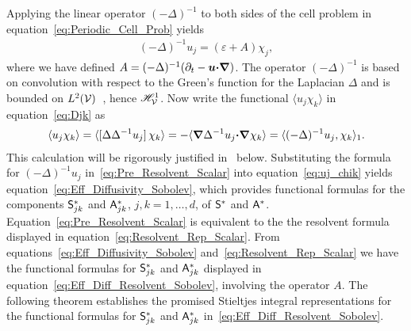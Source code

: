 \documentclass[amsa]{ipart}
\begin{document}
Applying the linear operator $(-\Delta)^{-1}$ to both sides of the cell
problem in equation~\eqref{eq:Periodic_Cell_Prob} yields
%
\begin{align}\label{eq:Pre_Resolvent_Scalar}
  (-\Delta)^{-1}u_j=(\varepsilon+A)\chi_j,
\end{align}
%
where we have defined $A=(-\Delta)^{-1}(\partial_t-\boldsymbol{u} \mbox{\boldmath${\cdot}$}\mbox{\boldmath${\nabla}$})$. The
operator $(-\Delta)^{-1}$ is based on convolution with respect to
the Green's function for the Laplacian $\Delta$ and is bounded on  
$L^2(\mathcal{V})$~\cite{Stakgold:BVP:2000}, hence $\mathscr{H}^1_{\mathcal{V}}$. Now write
the functional $\langle u_j\chi_k\rangle$ in equation~\eqref{eq:Djk}
as~\cite{Pavliotis:PHD_Thesis}    
%
\begin{align}\label{eq:uj_chik}
  \langle u_j\chi_k\rangle=\langle[\Delta\Delta^{-1}u_j]\,\chi_k\rangle
       =-\langle\bnabla \Delta^{-1}u_j\bcdot\bnabla \chi_k\rangle
       =\langle(-\Delta)^{-1}u_j,\chi_k\rangle_1.
\end{align}
%
This calculation will be rigorously justified
in~ below. Substituting the 
formula for $(-\Delta)^{-1}u_j$ in~\eqref{eq:Pre_Resolvent_Scalar} into
equation~\eqref{eq:uj_chik} yields
equation~\eqref{eq:Eff_Diffusivity_Sobolev}, which provides functional
formulas for the components
$\mathsf{S}^*_{jk}$ and $\mathsf{A}^*_{jk}$, $j,k=1,\ldots,d$, of $\mathsf{S}^*$ and $\mathsf{A}^*$.
Equation~\eqref{eq:Pre_Resolvent_Scalar}   
is equivalent to the the resolvent formula displayed in
equation~\eqref{eq:Resolvent_Rep_Scalar}. 
From equations~\eqref{eq:Eff_Diffusivity_Sobolev}
and~\eqref{eq:Resolvent_Rep_Scalar} we have the functional formulas
for $\mathsf{S}^*_{jk}$ and $\mathsf{A}^*_{jk}$ displayed in
equation~\eqref{eq:Eff_Diff_Resolvent_Sobolev}, involving the
operator $A$.
The following theorem establishes the promised Stieltjes integral
representations for the functional formulas for $\mathsf{S}^*_{jk}$ and $\mathsf{A}^*_{jk}$
in~\eqref{eq:Eff_Diff_Resolvent_Sobolev}.
\end{document}
